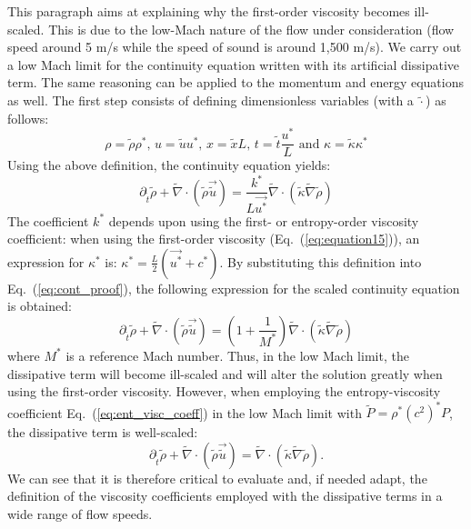 \documentclass[12pt]{article}
\newcommand{\eqt}[1]{Eq.~(\ref{#1})} %
\begin{document}
This paragraph aims at explaining why the first-order viscosity becomes ill-scaled. This is due to the low-Mach nature of the flow under consideration (flow speed around 5 m/s while the speed of sound is around 1,500 m/s). We carry out a low Mach limit for the continuity equation written with its artificial dissipative term. The same reasoning can be applied to the momentum and energy equations as well. The first step consists of defining dimensionless variables (with a $\tilde{\cdot}$) as follows:
\begin{equation}
\rho = \tilde{\rho} \rho^* \text{, } u = \tilde{u} u^* \text{, } x = \tilde{x} L \text{, } t = \tilde{t} \frac{u^*}{L} \text{ and } \kappa = \tilde{\kappa} \kappa^* 
\end{equation}
Using the above definition, the continuity equation yields:
\begin{equation}
\label{eq:cont_proof}
\partial_{\tilde{t}} \tilde{\rho} + \tilde{\nabla} \cdot \left( \tilde{\rho} \vec{\tilde{u}} \right) =  \frac{k^*}{L \vec{u^*}}  \tilde{\nabla}  \cdot  \left( \tilde{\kappa}  \tilde{\nabla} \tilde{\rho} \right)
\end{equation}
The coefficient $k^*$ depends upon using the first- or entropy-order viscosity coefficient: when using the first-order viscosity (\eqt{eq:equation15}), an expression for $\kappa^*$ is: $\kappa^* = \frac{L}{2}\left( \vec{u^*} + c^* \right)$. By substituting this definition into \eqt{eq:cont_proof}, the following expression for the scaled continuity equation is obtained:
\begin{equation}
\partial_{\tilde{t}} \tilde{\rho} + \tilde{\nabla} \cdot \left( \tilde{\rho} \vec{\tilde{u}} \right) = \left( 1 + \frac{1}{M^*} \right)  \tilde{\nabla} \cdot \left(\tilde{\kappa}\tilde{\nabla} \tilde{\rho} \right)
\end{equation}
where $M^*$ is a reference Mach number. Thus, in the low Mach limit, the dissipative term will become ill-scaled and will alter the solution greatly
when using the first-order viscosity. However, when employing the entropy-viscosity coefficient \eqt{eq:ent_visc_coeff} in the low Mach limit with 
$\tilde{P} = \rho^* (c^2)^* P$, the dissipative term is well-scaled:
\begin{equation}
\partial_{\tilde{t}} \tilde{\rho} + \tilde{\nabla} \cdot \left( \tilde{\rho} \vec{\tilde{u}} \right) =  \tilde{\nabla} \cdot  \left(\tilde{\kappa}\tilde{\nabla}  \tilde{\rho} \right).
\end{equation}
We can see that it is therefore critical to evaluate and, if needed adapt, the definition of the viscosity coefficients employed with the dissipative terms in a wide range of flow speeds.
\end{document}
